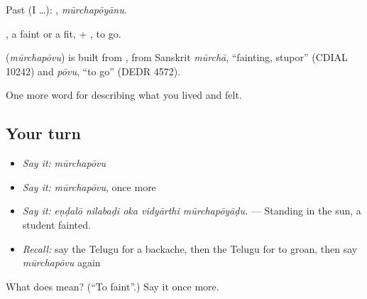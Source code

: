 Past (I …): , \emph{mūrchapōyānu}.

, a faint or a fit, + , to go.

\begin{cousinweb}
\textbf{} (\emph{mūrchapōvu}) is built from , from Sanskrit \emph{mūrchā}, \textquotedblleft{}fainting, stupor\textquotedblright{} (CDIAL 10242) and \emph{pōvu}, \textquotedblleft{}to go\textquotedblright{} (DEDR 4572).
\end{cousinweb}

\begin{grammarlens}[title={What you've built}]
One more word for describing what you lived and felt.
\end{grammarlens}

\subsection*{Your turn}
\begin{itemize}
\raggedright
  \item \emph{Say it:} \emph{mūrchapōvu}
  \item \emph{Say it:} \emph{mūrchapōvu}, once more
  \item \emph{Say it:} \emph{eṇḍalō nilabaḍi oka vidyārthi mūrchapōyāḍu.} — Standing in the sun, a student fainted.
  \item \emph{Recall:} say the Telugu for a backache, then the Telugu for to groan, then say \emph{mūrchapōvu} again
\end{itemize}

\begin{tcolorbox}[breakable,colback=teal!4,colframe=teal!35!black,title={Before you move on}]
What does  mean? (\textquotedblleft{}To faint\textquotedblright{}.) Say it once more.
\end{tcolorbox}

